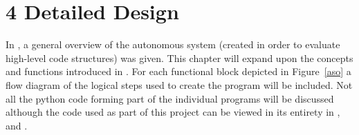 

\chapter*{4 Detailed Design}
\label{4detailedd}
\setcounter{chapter}{1}
\setcounter{section}{0}

In \textbf{}, a general overview of the autonomous system (created in order to evaluate high-level code structures) was given. This chapter will expand upon the concepts and functions introduced in \textbf{}. For each functional block depicted in Figure~\ref{aso} a flow diagram of the logical steps used to create the program will be included. Not all the python code forming part of the individual programs will be discussed although the code used as part of this project can be viewed in its entirety in \textbf{}, \textbf{} and \textbf{}.